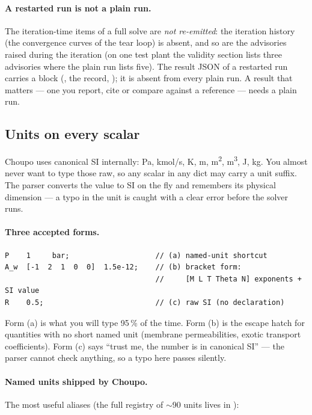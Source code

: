 \documentclass[11pt,a4paper]{article}
\begin{document}
\paragraph{A restarted run is not a plain run.}  The iteration-time items of
a full solve are \emph{not re-emitted}: the iteration history (the convergence
curves of the tear loop) is absent, and so are the advisories raised during
the iteration (on one test plant the validity section lists three advisories
where the plain run lists five).  The result JSON of a restarted run carries a
 block (, the record, );
it is absent from every plain run.  A result that matters --- one you report,
cite or compare against a reference --- needs a plain run.

\subsection{Units on every scalar}\label{sec:units-suffixes}

Choupo uses canonical SI internally: Pa, kmol/s, K, m, m\textsuperscript{2},
m\textsuperscript{3}, J, kg.  You almost never want to type those raw,
so any scalar in any dict may carry a unit suffix.  The parser converts
the value to SI on the fly and remembers its physical dimension --- a
typo in the unit is caught with a clear error before the solver runs.

\paragraph{Three accepted forms.}

\begin{lstlisting}[language=dict]
P    1     bar;                    // (a) named-unit shortcut
A_w  [-1  2  1  0  0]  1.5e-12;    // (b) bracket form:
                                   //     [M L T Theta N] exponents + SI value
R    0.5;                          // (c) raw SI (no declaration)
\end{lstlisting}

Form (a) is what you will type 95\,\% of the time.  Form (b) is the
escape hatch for quantities with no short named unit (membrane
permeabilities, exotic transport coefficients).  Form (c) says ``trust
me, the number is in canonical SI'' --- the parser cannot check
anything, so a typo here passes silently.

\paragraph{Named units shipped by Choupo.}  The most useful aliases
(the full registry of $\sim$90 units lives in ):
\end{document}
